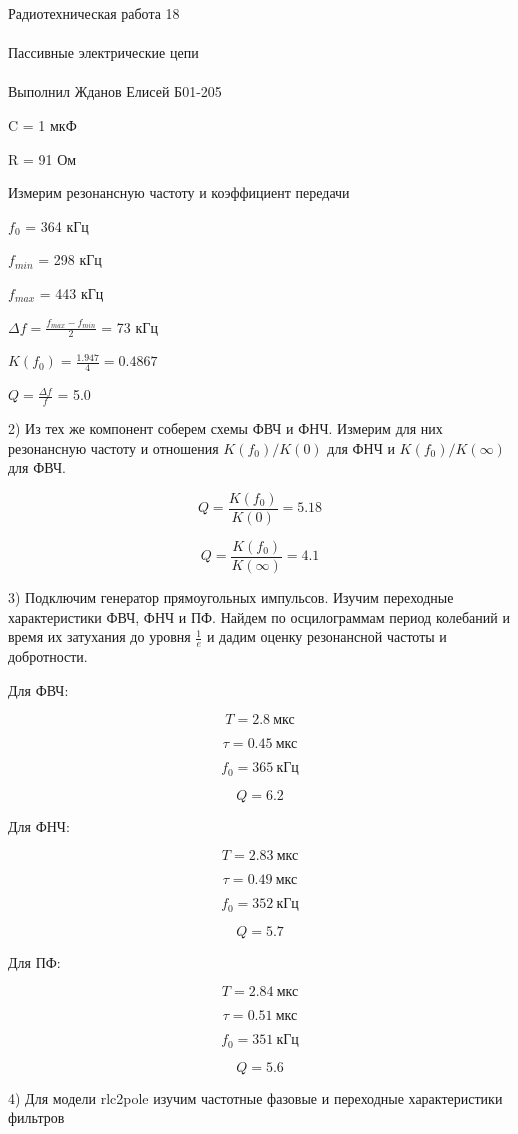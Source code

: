 \documentclass{astroedu-lab}
\begin{document}
\begin{problem}{\huge Радиотехническая работа 18\\\\Пассивные электрические цепи\\\\Выполнил Жданов Елисей Б01-205}
\begin{center}
	C = 1 мкФ
	
	R = 91 Ом
\end{center}

Измерим резонансную частоту и коэффициент передачи

\begin{center}
	$f_0$ = 364 кГц
	
	$f_{min}$ = 298 кГц
	
	$f_{max}$ = 443 кГц
	
	$\Delta f = \frac{f_{max} - f_{min}}{2}$ = 73 кГц
	
	$K(f_0) = \frac{1.947}{4} = 0.4867$
	
	$Q = \frac{\Delta f}{f}$ = 5.0
\end{center}

2) Из тех же компонент соберем схемы ФВЧ и ФНЧ. Измерим для них резонансную частоту и отношения $K(f_0)/K(0)$ для ФНЧ и $K(f_0)/K(\infty)$ для ФВЧ.

\[Q = \frac{K(f_0)}{K(0)} = 5.18\]

\[Q = \frac{K(f_0)}{K(\infty)} = 4.1\]

3) Подключим генератор прямоугольных импульсов. Изучим переходные характеристики ФВЧ, ФНЧ и ПФ. Найдем по осцилограммам период колебаний и время их затухания до уровня $\frac{1}{e}$ и дадим оценку резонансной частоты и добротности.

Для ФВЧ:

\[T = 2.8 \: \text{мкс}\]

\[\tau = 0.45 \: \text{мкс}\]

\[f_0 = 365 \: \text{кГц}\]

\[Q = 6.2\]

Для ФНЧ:

\[T = 2.83 \: \text{мкс}\]

\[\tau = 0.49 \: \text{мкс}\]

\[f_0 = 352 \: \text{кГц}\]

\[Q = 5.7\]

Для ПФ:

\[T = 2.84 \: \text{мкс}\]

\[\tau = 0.51 \: \text{мкс}\]

\[f_0 = 351 \: \text{кГц}\]

\[Q = 5.6\]

4) Для модели rlc2pole изучим частотные фазовые и переходные характеристики фильтров


\end{problem}
\end{document}
